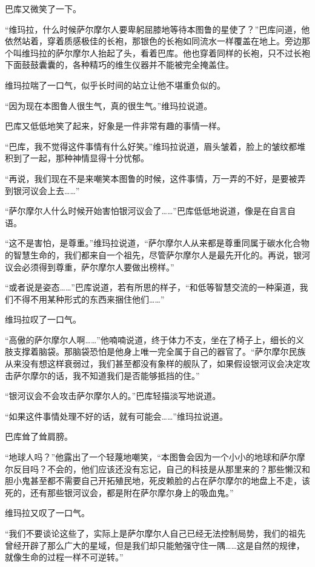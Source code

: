 巴库又微笑了一下。

“维玛拉，什么时候萨尔摩尔人要卑躬屈膝地等待本图鲁的星使了？”巴库问道，他依然站着，穿着质感极佳的长袍，那银色的长袍如同流水一样覆盖在地上。旁边那个叫维玛拉的萨尔摩尔人抬起了头，看着巴库。他也穿着同样的长袍，只不过长袍下面鼓鼓囊囊的，各种精巧的维生仪器并不能被完全掩盖住。

维玛拉喘了一口气，似乎长时间的站立让他不堪重负似的。

“因为现在本图鲁人很生气，真的很生气。”维玛拉说道。

巴库又低低地笑了起来，好象是一件非常有趣的事情一样。

“巴库，我不觉得这件事情有什么好笑。”维玛拉说道，眉头皱着，脸上的皱纹都堆积到了一起，那种神情显得十分忧郁。

“再说，我们现在不是来嘲笑本图鲁的时候，这件事情，万一弄的不好，是要被弄到银河议会上去……”

“萨尔摩尔人什么时候开始害怕银河议会了……”巴库低低地说道，像是在自言自语。

“这不是害怕，是尊重。”维玛拉说道，“萨尔摩尔人从来都是尊重同属于碳水化合物的智慧生命的，我们都来自一个祖先，尽管萨尔摩尔人是最先开化的。再说，银河议会必须得到尊重，萨尔摩尔人要做出榜样。”

“或者说是姿态……”巴库说道，若有所思的样子，“和低等智慧交流的一种渠道，我们不得不用某种形式的东西来捆住他们……”

维玛拉叹了一口气。

“高傲的萨尔摩尔人啊……”他喃喃说道，终于体力不支，坐在了椅子上，细长的义肢支撑着脑袋。那脑袋恐怕是他身上唯一完全属于自己的器官了。“萨尔摩尔民族从来没有想这样衰弱过，我们甚至都没有象样的舰队了，如果假设银河议会决定攻击萨尔摩尔的话，我不知道我们是否能够抵挡的住。”

“银河议会不会攻击萨尔摩尔人的。”巴库轻描淡写地说道。

“如果这件事情处理不好的话，就有可能会……”维玛拉说道。

巴库耸了耸肩膀。

“地球人吗？”他露出了一个轻蔑地嘲笑，“本图鲁会因为一个小小的地球和萨尔摩尔反目吗？不会的，他们应该还没有忘记，自己的科技是从那里来的？那些懒汉和胆小鬼甚至都不需要自己开拓殖民地，死皮赖脸的占在萨尔摩尔的地盘上不走，该死的，还有那些银河议会，都是附在萨尔摩尔身上的吸血鬼。”

维玛拉又叹了一口气。

“我们不要谈论这些了，实际上是萨尔摩尔人自己已经无法控制局势，我们的祖先曾经开辟了那么广大的星域，但是我们却只能勉强守住一隅……这是自然的规律，就像生命的过程一样不可逆转。”

